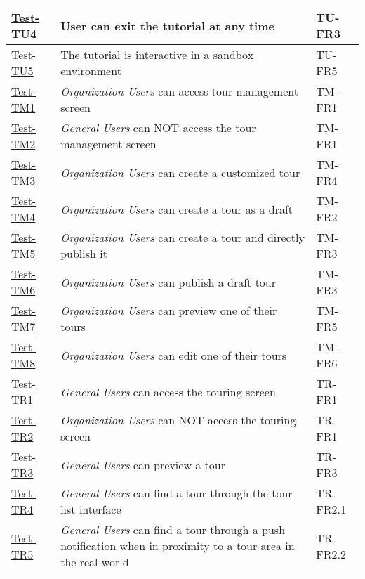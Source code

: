 \documentclass[12pt, titlepage]{article}
\begin{document}
\begin{enumerate}
\begin{table}[h!]
\begin{tabular}{|l|l|l|}
        \hline
        \hyperref[itm:Test-TU4]{Test-TU4} & User can exit the tutorial at any time & TU-FR3 \\
        \hline
        \hyperref[itm:Test-TU5]{Test-TU5} & The tutorial is interactive in a sandbox environment & TU-FR5 \\
        \hline
        \hyperref[itm:Test-TM1]{Test-TM1} & \textit{Organization Users} can access tour management screen & TM-FR1 \\
        \hline
        \hyperref[itm:Test-TM2]{Test-TM2} & \textit{General Users} can NOT access the tour management screen & TM-FR1 \\
        \hline
        \hyperref[itm:Test-TM3]{Test-TM3} & \textit{Organization Users} can create a customized tour & TM-FR4 \\
        \hline
        \hyperref[itm:Test-TM4]{Test-TM4} & \textit{Organization Users} can create a tour as a draft & TM-FR2 \\
        \hline
        \hyperref[itm:Test-TM5]{Test-TM5} & \textit{Organization Users} can create a tour and directly publish it & TM-FR3 \\
        \hline
        \hyperref[itm:Test-TM6]{Test-TM6} & \textit{Organization Users} can publish a draft tour & TM-FR3 \\
        \hline
        \hyperref[itm:Test-TM7]{Test-TM7} & \textit{Organization Users} can preview one of their tours & TM-FR5 \\
        \hline
        \hyperref[itm:Test-TM8]{Test-TM8} & \textit{Organization Users} can edit one of their tours & TM-FR6 \\
        \hline
        \hyperref[itm:Test-TR1]{Test-TR1} & \textit{General Users} can access the touring screen & TR-FR1 \\
        \hline
        \hyperref[itm:Test-TR2]{Test-TR2} & \textit{Organization Users} can NOT access the touring screen & TR-FR1 \\
        \hline
        \hyperref[itm:Test-TR3]{Test-TR3} & \textit{General Users} can preview a tour & TR-FR3 \\
        \hline
        \hyperref[itm:Test-TR4]{Test-TR4} & \textit{General Users} can find a tour through the tour list interface & TR-FR2.1 \\
        \hline
        \hyperref[itm:Test-TR5]{Test-TR5} & \textit{General Users} can find a tour through a push notification when in proximity to a tour area in the real-world & TR-FR2.2 \\
        \hline

\end{tabular}
\end{table}
\end{enumerate}
\end{document}

